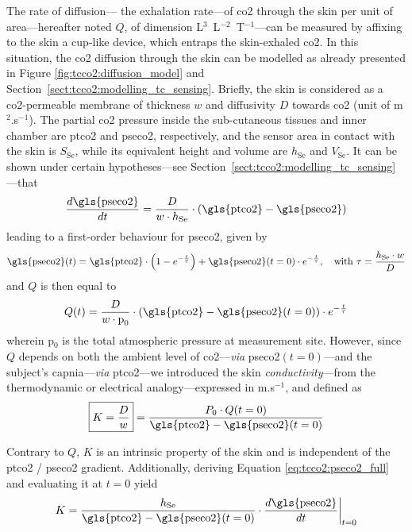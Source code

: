 The rate of diffusion---\aka{} the exhalation rate---of \gls{co2} through the skin per unit of area---hereafter noted $Q$, of dimension L$^3$~L$^{-2}$~T$^{-1}$---can be measured by affixing to the skin a cup-like device, which entraps the skin-exhaled \gls{co2}. In this situation, the \gls{co2} diffusion through the skin can be modelled as already presented in Figure \ref{fig:tcco2:diffusion_model} and Section~\ref{sect:tcco2:modelling_tc_sensing}. Briefly, the skin is considered as a \gls{co2}-permeable membrane of thickness $w$ and diffusivity $D$ towards \gls{co2} (unit of m$^2$.s$^{-1}$). The partial \gls{co2} pressure inside the sub-cutaneous tissues and inner chamber are \gls{ptco2} and \gls{pseco2}, respectively, and the sensor area in contact with the skin is $S_\text{Se}$, while its equivalent height and volume are $h_\text{Se}$ and $V_\text{Se}$. It can be shown under certain hypotheses---see Section~\ref{sect:tcco2:modelling_tc_sensing}---that
\begin{equation}\label{eq:tcco2:equa_diff_comp}
	\frac{d \text{\gls{pseco2}}}{dt} = \frac{D}{w \cdot h_\text{Se}} \cdot \left( \text{\gls{ptco2}} - \text{\gls{pseco2}} \right)
\end{equation}
leading to a first-order behaviour for \gls{pseco2}, given by
\begin{equation}\label{eq:tcco2:pseco2_full}
	\text{\gls{pseco2}}(t) = \text{\gls{ptco2}} \cdot \left( 1 - e^{ -\frac{t}{\tau} } \right) + \text{\gls{pseco2}}(t=0) \cdot e^{ -\frac{t}{\tau}}, \quad \text{with } \tau = \frac{h_\text{Se} \cdot w}{D}
\end{equation}
and $Q$ is then equal to
\begin{equation}\label{eq:tcco2:q_def}
	Q(t) = \frac{D}{w \cdot \text{p}_0}\cdot \left(\text{\gls{ptco2}} - \text{\gls{pseco2}}(t=0)\right) \cdot e^{ -\frac{t}{\tau}}
\end{equation}
wherein p$_0$ is the total atmospheric pressure at measurement site. However, since $Q$ depends on both the ambient level of \gls{co2}---\textit{via} \gls{pseco2}$(t=0)$---and the subject's capnia---\textit{via} \gls{ptco2}---we introduced the skin \emph{conductivity}---from the thermodynamic or electrical analogy---expressed in m.s$^{-1}$, and defined as
\begin{equation}\label{eq:tcco2:k_def}
	\boxed{K = \frac{D}{w}} = \frac{P_0 \cdot Q(t=0)}{\text{\gls{ptco2}} - \text{\gls{pseco2}}(t=0)}
\end{equation}

Contrary to $Q$, $K$ is an intrinsic property of the skin and is independent of the \gls{ptco2} / \gls{pseco2} gradient. Additionally, deriving Equation \ref{eq:tcco2:pseco2_full} and evaluating it at $t=0$ yield
\begin{equation}\label{eq:tcco2:k_effective_calc}
	K = \frac{h_\text{Se}}{\text{\gls{ptco2}} - \text{\gls{pseco2}}(t=0)} \cdot \frac{d\text{\gls{pseco2}}}{dt} \biggr\rvert_{t=0}
\end{equation}

